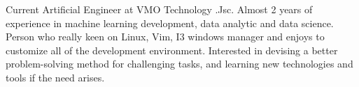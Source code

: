 

\begin{cvparagraph}

Current Artificial Engineer at VMO Technology .Jsc. Almost 2 years of experience in machine learning development, data analytic and data science. Person who really keen on Linux, Vim, I3 windows manager and enjoys to customize all of the development environment. Interested in devising a better problem-solving method for challenging tasks, and learning new technologies and tools if the need arises.
\end{cvparagraph}
